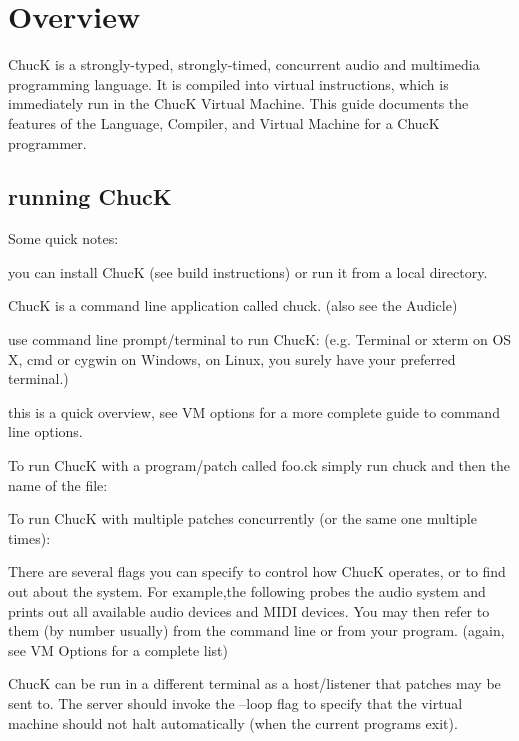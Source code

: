 \chapter{Overview}



ChucK is a strongly-typed, strongly-timed, concurrent audio and multimedia programming language. It is compiled into virtual instructions, which is immediately run in the ChucK Virtual Machine. This guide documents the features of the Language, Compiler, and Virtual Machine for a ChucK programmer.
 
\section{running ChucK}

Some quick notes:
\begin{chuckitemize}
\item you can install ChucK (see build instructions) or run it from a local directory.
\item ChucK is a command line application called chuck. (also see the Audicle)
\item use command line prompt/terminal to run ChucK: (e.g. Terminal or xterm on OS X, cmd or cygwin on Windows, on Linux, you surely have your preferred terminal.)
\item this is a quick overview, see VM options for a more complete guide to command line options.
\end{chuckitemize}
To run ChucK with a program/patch called foo.ck simply run chuck and then the name of the file:

To run ChucK with multiple patches concurrently (or the same one multiple times):

There are several flags you can specify to control how ChucK operates, or to find out about the system. For example,the following probes the audio system and prints out all available audio devices and MIDI devices. You may then refer to them (by number usually) from the command line or from your program. (again, see VM Options for a complete list)

ChucK can be run in a different terminal as a host/listener that patches may be sent to. The server should invoke the --loop flag to specify that the virtual machine should not halt automatically (when the current programs exit).

